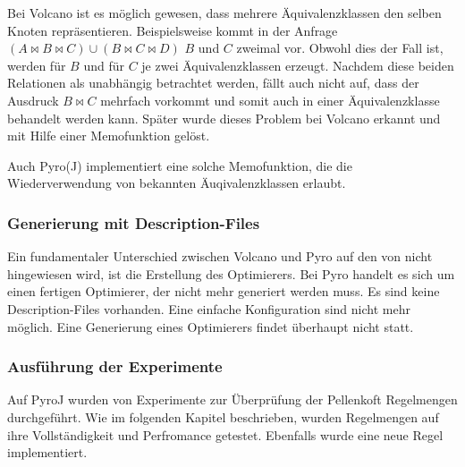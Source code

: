 Bei Volcano ist es möglich gewesen, dass mehrere Äquivalenzklassen den selben Knoten repräsentieren. Beispielsweise kommt in der Anfrage $(A \Join B \Join C) \cup (B \Join C \Join D)$ $B$ und $C$ zweimal vor. Obwohl dies der Fall ist, werden für $B$ und für $C$ je zwei Äquivalenzklassen erzeugt. Nachdem diese beiden Relationen als unabhängig betrachtet werden, fällt auch nicht auf, dass der Ausdruck $B \Join C$ mehrfach vorkommt und somit auch in einer Äquivalenzklasse behandelt werden kann. Später wurde dieses Problem bei Volcano erkannt und mit Hilfe einer Memofunktion gelöst.

Auch Pyro(J) implementiert eine solche Memofunktion, die die Wiederverwendung von bekannten Äuqivalenzklassen erlaubt.


\subsubsection{Generierung mit Description-Files}

Ein fundamentaler Unterschied zwischen Volcano und Pyro auf den von \cite{roy2001multi} nicht hingewiesen wird, ist die Erstellung des Optimierers. Bei Pyro handelt es sich um einen fertigen Optimierer, der nicht mehr generiert werden muss. Es sind keine Description-Files vorhanden. Eine einfache Konfiguration sind nicht mehr möglich. Eine Generierung eines Optimierers findet überhaupt nicht statt.


\subsubsection{Ausführung der Experimente}

Auf PyroJ wurden von \cite{shanbhag2014optimizing} Experimente zur Überprüfung der Pellenkoft Regelmengen durchgeführt. Wie im folgenden Kapitel beschrieben, wurden Regelmengen auf ihre Vollständigkeit und Perfromance getestet. Ebenfalls wurde eine neue Regel implementiert. 
